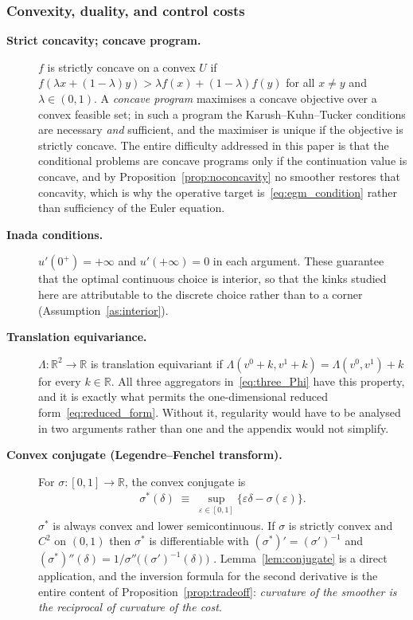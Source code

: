 \subsubsection{Convexity, duality, and control costs}

\begin{description}

\item[\textnormal{\textbf{Strict concavity; concave program.}}]
$f$ is strictly concave on a convex $U$ if
$f(\lambda x+(1-\lambda)y)>\lambda f(x)+(1-\lambda)f(y)$ for all $x\neq y$ and
$\lambda\in(0,1)$. A \emph{concave program} maximises a concave objective over a convex
feasible set; in such a program the Karush--Kuhn--Tucker conditions are necessary
\emph{and} sufficient, and the maximiser is unique if the objective is strictly concave.
The entire difficulty addressed in this paper is that the conditional problems are
concave programs only if the continuation value is concave, and by
Proposition~\ref{prop:noconcavity} no smoother restores that concavity, which is why
the operative target is~\eqref{eq:egm_condition} rather than sufficiency of the Euler
equation.

\item[\textnormal{\textbf{Inada conditions.}}]
$u'(0^{+})=+\infty$ and $u'(+\infty)=0$ in each argument. These guarantee that the
optimal continuous choice is interior, so that the kinks studied here are attributable
to the discrete choice rather than to a corner (Assumption~\ref{as:interior}).

\item[\textnormal{\textbf{Translation equivariance.}}]
$\Lambda:\mathbb{R}^{2}\to\mathbb{R}$ is translation equivariant if
$\Lambda(v^{0}+k,v^{1}+k)=\Lambda(v^{0},v^{1})+k$ for every $k\in\mathbb{R}$. All three
aggregators in~\eqref{eq:three_Phi} have this property, and it is exactly what permits
the one-dimensional reduced form~\eqref{eq:reduced_form}. Without it, regularity would
have to be analysed in two arguments rather than one and the appendix would not
simplify.

\item[\textnormal{\textbf{Convex conjugate (Legendre--Fenchel transform).}}]
For $\sigma:[0,1]\to\mathbb{R}$, the convex conjugate is
\begin{align}
\sigma^{\ast}(\delta) \;\equiv\; \sup_{\varepsilon\in[0,1]}\big\{\varepsilon\delta-\sigma(\varepsilon)\big\}.
\end{align}
$\sigma^{\ast}$ is always convex and lower semicontinuous. If $\sigma$ is strictly
convex and $C^{2}$ on $(0,1)$ then $\sigma^{\ast}$ is differentiable with
$(\sigma^{\ast})'=(\sigma')^{-1}$ and
$(\sigma^{\ast})''(\delta)=1/\sigma''\big((\sigma')^{-1}(\delta)\big)$
\citep{Rockafellar1970-cv}. Lemma~\ref{lem:conjugate} is a direct application, and the
inversion formula for the second derivative is the entire content of
Proposition~\ref{prop:tradeoff}: \emph{curvature of the smoother is the reciprocal of
curvature of the cost}.


\end{description}
